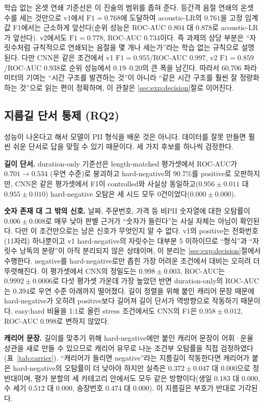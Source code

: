 \documentclass[10pt,twocolumn]{article}
\begin{document}
학습 없는 온셋 연쇄 기준선은 이 진술의 범위를 좁혀 준다. 등간격 음절 연쇄의 온셋 수를 세는
것만으로 v1에서 $\text{F1}=0.768$에 도달하여 acoustic-LR의 $0.761$을 고정 임계값 F1에서는
근소하게 앞선다(순위 성능은 ROC-AUC $0.804$ 대 $0.878$로 acoustic-LR가 앞선다). v2에서도
$\text{F1}=0.778$, ROC-AUC $0.734$이다. 즉 과제의 상당 부분은 ``자릿수처럼 규칙적으로 연쇄되는
음절을 몇 개나 세는가''라는 학습 없는 규칙으로 설명된다. 다만 CNN은 같은 조건에서 v1
$\text{F1}=0.955$/ROC-AUC $0.997$, v2 $\text{F1}=0.859$/ROC-AUC $0.938$로 순위 성능에서
$0.19$--$0.20$의 큰 폭을 남긴다. 따라서 60{,}706 파라미터의 기여는 ``시간 구조를 발견하는
것''이 아니라 ``같은 시간 구조를 훨씬 잘 정량화하는 것''으로 읽는 편이 정확하며, 이 관찰은
\ref{sec:exp:decision}절로 이어진다.

\subsection{지름길 단서 통제 (RQ2)}
성능이 나온다고 해서 모델이 PII 형식을 배운 것은 아니다. 데이터를 잘못 만들면 훨씬 쉬운 단서로
답을 맞힐 수 있기 때문이다. 세 가지 후보를 하나씩 검정한다.

\textbf{길이 단서.} duration-only 기준선은 length-matched 평가셋에서 ROC-AUC가 $0.701\to0.534$
(우연 수준)로 붕괴하고 hard-negative의 90.7\%를 positive로 오판하지만, CNN은 같은 평가셋에서
F1이 controlled와 사실상 동일하고($0.956\pm0.011$ 대 $0.955\pm0.010$) hard-negative 오탐은 세
시드 모두 0건이었다($0.000\pm0.000$).

\textbf{숫자 존재 대 그 밖의 신호.} 날짜, 주문번호, 가격 등 비PII 숫자열에 대한 오탐률이
$0.006\pm0.008$로 매우 낮아 판별 근거가 ``숫자가 들린다''는 사실 자체는 아님이 확인된다. 다만
이 조건만으로는 남은 신호가 무엇인지 알 수 없다. v1의 positive는 전화번호(11자리) 하나뿐이고
v1 hard-negative의 자릿수는 대부분 5 이하이므로 ``형식''과 ``자릿수 낭독의 분량''이 아직
분리되지 않은 상태이며, 이 분리는 \ref{sec:exp:decision}절에서 수행한다. negative를
hard-negative로만 좁힌 가장 어려운 조건에서 대비는 오히려 더 뚜렷해진다. 이 평가셋에서 CNN의
정밀도는 $0.998\pm0.003$, ROC-AUC는 $0.9992\pm0.0006$로 다섯 평가셋 가운데 가장 높았던 반면
duration-only의 ROC-AUC는 $0.394$로 우연 수준 아래까지 떨어졌다. 길이 정렬을 위해 붙인 캐리어
문장 때문에 hard-negative가 오히려 positive보다 길어져 길이 단서가 역방향으로 작동하기
때문이다. easy:hard 비율을 1:1로 올린 stress 조건에서도 CNN의 F1은 $0.958\pm0.012$, ROC-AUC
$0.998$로 변하지 않았다.

\textbf{캐리어 문장.} 길이를 맞추기 위해 hard-negative에만 붙인 캐리어 문장이 어휘·운율 상관을
새로 만들 수 있으므로 캐리어 유무로 나눈 조건부 오탐률을 직접 검정하였다(표~\ref{tab:carrier}).
``캐리어가 들리면 negative''라는 지름길이 작동한다면 캐리어가 붙은 hard-negative의 오탐률이 더
낮아야 하지만 실측은 $0.372\pm0.047$ 대 $0.000$으로 정반대이며, 평가 분할의 세 카테고리
안에서도 모두 같은 방향이다(생일 $0.183$ 대 $0.000$, 수 세기 $0.512$ 대 $0.000$, 송장번호
$0.474$ 대 $0.000$). 이 지름길은 부호가 반대로 기각된다.
\end{document}

